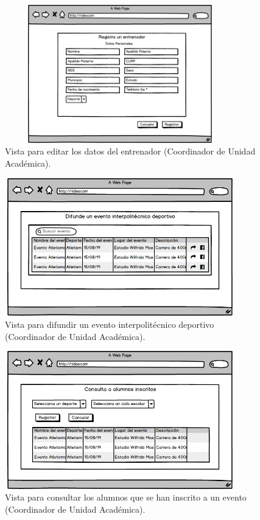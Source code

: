 		\begin{figure} [hbt!]
			\centering
			\includegraphics[width=10cm, height=6cm]{Imagenes/Nuevos/P13_Editar_entrenador}
			\caption{Vista para editar los datos del entrenador (Coordinador de Unidad Académica).}
			\label{editarentrenador}
		\end{figure}
		
		\begin{figure} [hbt!]
			\centering
			\includegraphics[width=10cm, height=6cm]{Imagenes/Nuevos/P14_Difundir_evento}
			\caption{Vista para difundir un evento interpolitécnico deportivo (Coordinador de Unidad Académica).}
			\label{difundirevento}
		\end{figure}
	\pagebreak
		\begin{figure} [hbt!]
			\centering
			\includegraphics[width=10cm, height=6cm]{Imagenes/Nuevos/P15_Consulta_alumnos_inscritos}
			\caption{Vista para consultar los alumnos que se han inscrito a un evento (Coordinador de Unidad Académica).}
			\label{consultaalumnosinscritos}
		\end{figure}
	
